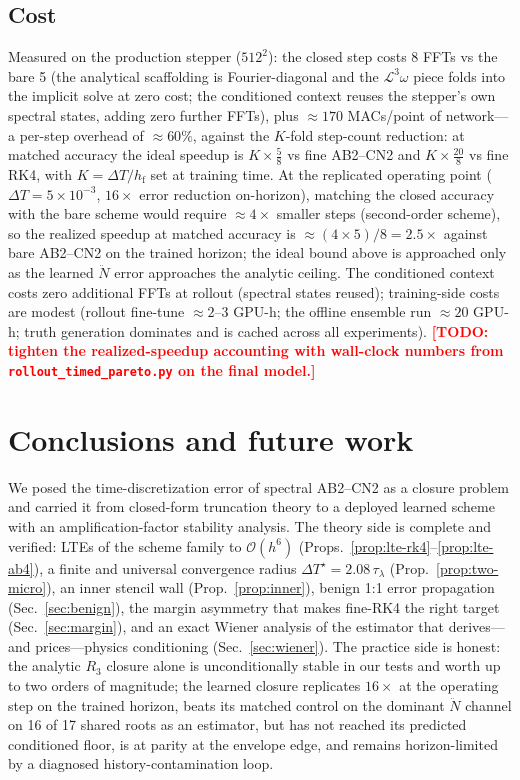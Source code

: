 \documentclass[11pt]{article}
\theoremstyle{plain}
\theoremstyle{definition}
\newcommand{\TODO}[1]{\textcolor{red}{\textbf{[TODO: #1]}}}
\newcommand{\Lop}{\mathcal{L}}
\newcommand{\Nddot}{\ddot{N}}
\newcommand{\bO}{\mathcal{O}}
\newcommand{\DT}{\Delta T}
\newcommand{\DTs}{\Delta T^{\star}}
\newcommand{\hf}{h_{\mathrm{f}}}
\newcommand{\taul}{\tau_{\lambda}}
\begin{document}
\subsection{Cost}
\label{sec:results-cost}
Measured on the production stepper ($512^2$): the closed step costs 8 FFTs vs
the bare 5 (the analytical scaffolding is Fourier-diagonal and the
$\Lop^3\omega$ piece folds into the implicit solve at zero cost; the
conditioned context reuses the stepper's own spectral states, adding zero
further FFTs), plus $\approx170$ MACs/point of network---a per-step overhead
of $\approx60\%$, against the $K$-fold step-count reduction: at matched
accuracy the ideal speedup is
$K\times\tfrac58$ vs fine AB2--CN2 and $K\times\tfrac{20}8$ vs fine RK4, with
$K=\DT/\hf$ set at training time. At the replicated operating point
($\DT=5\times10^{-3}$, $16\times$ error reduction on-horizon), matching the
closed accuracy with the bare scheme would require $\approx4\times$ smaller
steps (second-order scheme), so the realized speedup at matched accuracy is
$\approx(4\times5)/8=2.5\times$ against bare AB2--CN2 on the trained horizon;
the ideal bound above is approached only as the learned
$\Nddot$ error approaches the analytic ceiling.
The conditioned context costs zero additional FFTs at rollout (spectral
states reused); training-side costs are modest (rollout fine-tune
$\approx2$--$3$ GPU-h; the offline ensemble run $\approx20$ GPU-h; truth
generation dominates and is cached across all experiments).
\TODO{tighten the realized-speedup accounting with wall-clock numbers from
\texttt{rollout\_timed\_pareto.py} on the final model.}

\section{Conclusions and future work}
\label{sec:conclusion}
We posed the time-discretization error of spectral AB2--CN2 as a closure
problem and carried it from closed-form truncation theory to a deployed
learned scheme with an amplification-factor stability analysis. The theory side is complete and
verified: LTEs of the scheme family to $\bO(h^6)$
(Props.~\ref{prop:lte-rk4}--\ref{prop:lte-ab4}), a finite and universal
convergence radius $\DTs=2.08\,\taul$ (Prop.~\ref{prop:two-micro}), an inner
stencil wall (Prop.~\ref{prop:inner}), benign 1:1 error propagation
(Sec.~\ref{sec:benign}), the margin asymmetry that makes fine-RK4 the right
target (Sec.~\ref{sec:margin}), and an exact Wiener analysis of the estimator
that derives---and prices---physics conditioning
(Sec.~\ref{sec:wiener}). The practice side is honest: the analytic $R_3$
closure alone is unconditionally stable in our tests and worth up to two
orders of magnitude; the learned closure replicates $16\times$ at the
operating step on the trained horizon, beats its matched control on the
dominant $\Nddot$ channel on 16 of 17 shared roots as an estimator,
but has not reached its predicted conditioned floor, is at
parity at the envelope edge, and remains horizon-limited by a diagnosed
history-contamination loop.
\end{document}
